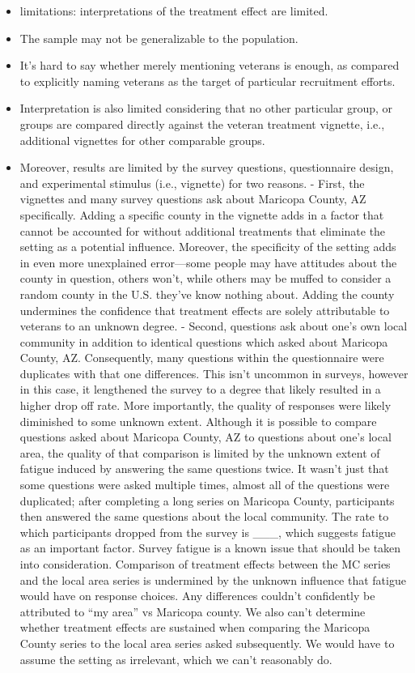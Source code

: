 \documentclass[
  11pt,
  a4paper,
]{scrartcl}
\providecommand{\tightlist}{%
  \setlength{\itemsep}{0pt}\setlength{\parskip}{0pt}}\usepackage{longtable,booktabs,array}
\begin{document}
\begin{itemize}
\tightlist
\item
  limitations: interpretations of the treatment effect are limited.
\item
  The sample may not be generalizable to the population.
\item
  It's hard to say whether merely mentioning veterans is enough, as
  compared to explicitly naming veterans as the target of particular
  recruitment efforts.
\item
  Interpretation is also limited considering that no other particular
  group, or groups are compared directly against the veteran treatment
  vignette, i.e., additional vignettes for other comparable groups.
\item
  Moreover, results are limited by the survey questions, questionnaire
  design, and experimental stimulus (i.e., vignette) for two reasons. -
  First, the vignettes and many survey questions ask about Maricopa
  County, AZ specifically. Adding a specific county in the vignette adds
  in a factor that cannot be accounted for without additional treatments
  that eliminate the setting as a potential influence. Moreover, the
  specificity of the setting adds in even more unexplained error---some
  people may have attitudes about the county in question, others won't,
  while others may be muffed to consider a random county in the U.S.
  they've know nothing about. Adding the county undermines the
  confidence that treatment effects are solely attributable to veterans
  to an unknown degree. - Second, questions ask about one's own local
  community in addition to identical questions which asked about
  Maricopa County, AZ. Consequently, many questions within the
  questionnaire were duplicates with that one differences. This isn't
  uncommon in surveys, however in this case, it lengthened the survey to
  a degree that likely resulted in a higher drop off rate. More
  importantly, the quality of responses were likely diminished to some
  unknown extent. Although it is possible to compare questions asked
  about Maricopa County, AZ to questions about one's local area, the
  quality of that comparison is limited by the unknown extent of fatigue
  induced by answering the same questions twice. It wasn't just that
  some questions were asked multiple times, almost all of the questions
  were duplicated; after completing a long series on Maricopa County,
  participants then answered the same questions about the local
  community. The rate to which participants dropped from the survey is
  \_\_\_, which suggests fatigue as an important factor. Survey fatigue
  is a known issue that should be taken into consideration. Comparison
  of treatment effects between the MC series and the local area series
  is undermined by the unknown influence that fatigue would have on
  response choices. Any differences couldn't confidently be attributed
  to ``my area'' vs Maricopa county. We also can't determine whether
  treatment effects are sustained when comparing the Maricopa County
  series to the local area series asked subsequently. We would have to
  assume the setting as irrelevant, which we can't reasonably do.
\end{itemize}
\end{document}
